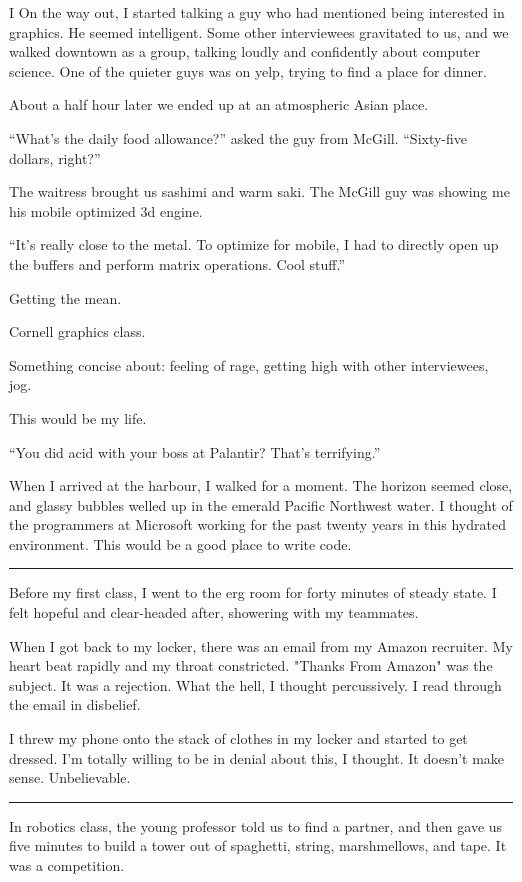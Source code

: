   I On the way out, I started talking a guy who had mentioned
being interested in graphics.  He seemed intelligent.  Some other interviewees
gravitated to us, and we walked downtown as a group, talking loudly and
confidently about computer science.  One of the quieter guys was on yelp, trying
to find a place for dinner.

About a half hour later we ended up at an atmospheric Asian place.

``What's the daily food allowance?'' asked the guy from McGill. ``Sixty-five
dollars, right?''

The waitress brought us sashimi and warm saki.  The McGill guy was showing me
his mobile optimized 3d engine.

``It's really close to the metal.  To optimize for mobile, I had to directly
open up the buffers and perform matrix operations.  Cool stuff.''

Getting the mean.

Cornell graphics class.

Something concise about: feeling of rage, getting high with other interviewees, jog.

This would be my life.

``You did acid with your boss at Palantir?  That's terrifying.''

When I arrived at the harbour, I walked for a moment.  The horizon seemed close,
and glassy bubbles welled up in the emerald Pacific Northwest water.  I thought
of the programmers at Microsoft working for the past twenty years in this
hydrated environment.  This would be a good place to write code.

\plainfancybreak{12pt}{2}{* * *}

Before my first class, I went to the erg room for forty minutes of steady state.
I felt hopeful and clear-headed after, showering with my teammates.

When I got back to my locker, there was an email from my Amazon recruiter.  My
heart beat rapidly and my throat constricted.  "Thanks From Amazon" was the
subject.  It was a rejection.  What the hell, I thought percussively.  I read
through the email in disbelief.

I threw my phone onto the stack of clothes in my locker and started to get
dressed.  I'm totally willing to be in denial about this, I thought.  It doesn't
make sense.  Unbelievable.

\plainfancybreak{12pt}{2}{* * *}

In robotics class, the young professor told us to find a partner, and then gave
us five minutes to build a tower out of spaghetti, string, marshmellows, and
tape.  It was a competition.

